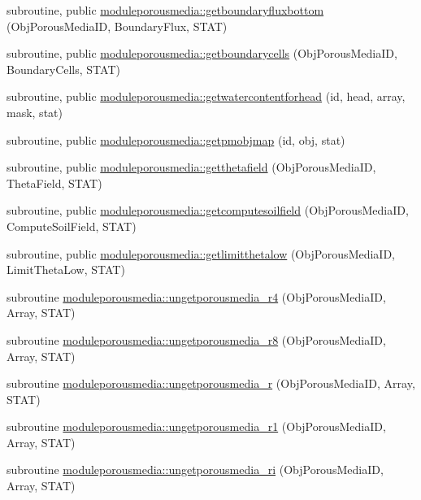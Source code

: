 \begin{DoxyCompactItemize}
subroutine, public \mbox{\hyperlink{namespacemoduleporousmedia_ad1e02ec3a85b11609df54fd2e561da0d}{moduleporousmedia\+::getboundaryfluxbottom}} (Obj\+Porous\+Media\+ID, Boundary\+Flux, S\+T\+AT)
\item 
subroutine, public \mbox{\hyperlink{namespacemoduleporousmedia_a791a426544d46967cd83d7b81926e26a}{moduleporousmedia\+::getboundarycells}} (Obj\+Porous\+Media\+ID, Boundary\+Cells, S\+T\+AT)
\item 
subroutine, public \mbox{\hyperlink{namespacemoduleporousmedia_ab9c801f3c5442ad39e9dcb57a60fe017}{moduleporousmedia\+::getwatercontentforhead}} (id, head, array, mask, stat)
\item 
subroutine, public \mbox{\hyperlink{namespacemoduleporousmedia_ab411441ee4f139b7e2efb9f91cad1778}{moduleporousmedia\+::getpmobjmap}} (id, obj, stat)
\item 
subroutine, public \mbox{\hyperlink{namespacemoduleporousmedia_a4733e16297b69cfac43e1f2f0cd30381}{moduleporousmedia\+::getthetafield}} (Obj\+Porous\+Media\+ID, Theta\+Field, S\+T\+AT)
\item 
subroutine, public \mbox{\hyperlink{namespacemoduleporousmedia_ae3c2ce61a7783cf1653e19109914fe29}{moduleporousmedia\+::getcomputesoilfield}} (Obj\+Porous\+Media\+ID, Compute\+Soil\+Field, S\+T\+AT)
\item 
subroutine, public \mbox{\hyperlink{namespacemoduleporousmedia_a3070d5af7ef46dbbb22e63098a25f566}{moduleporousmedia\+::getlimitthetalow}} (Obj\+Porous\+Media\+ID, Limit\+Theta\+Low, S\+T\+AT)
\item 
subroutine \mbox{\hyperlink{namespacemoduleporousmedia_a90cbc92ae3cf9c9c828403c5fdc6c414}{moduleporousmedia\+::ungetporousmedia\+\_\+r4}} (Obj\+Porous\+Media\+ID, Array, S\+T\+AT)
\item 
subroutine \mbox{\hyperlink{namespacemoduleporousmedia_a4341a39680ae8538342f20cb21df9b6a}{moduleporousmedia\+::ungetporousmedia\+\_\+r8}} (Obj\+Porous\+Media\+ID, Array, S\+T\+AT)
\item 
subroutine \mbox{\hyperlink{namespacemoduleporousmedia_a762615c8c034a45d738dd8a156eeed72}{moduleporousmedia\+::ungetporousmedia\+\_\+r}} (Obj\+Porous\+Media\+ID, Array, S\+T\+AT)
\item 
subroutine \mbox{\hyperlink{namespacemoduleporousmedia_ac6425bf5e26a5219b8c52bbabeda12ce}{moduleporousmedia\+::ungetporousmedia\+\_\+r1}} (Obj\+Porous\+Media\+ID, Array, S\+T\+AT)
\item 
subroutine \mbox{\hyperlink{namespacemoduleporousmedia_a1ceb6ca7f8349192893a0bd63cf7403d}{moduleporousmedia\+::ungetporousmedia\+\_\+ri}} (Obj\+Porous\+Media\+ID, Array, S\+T\+AT)

\end{DoxyCompactItemize}
